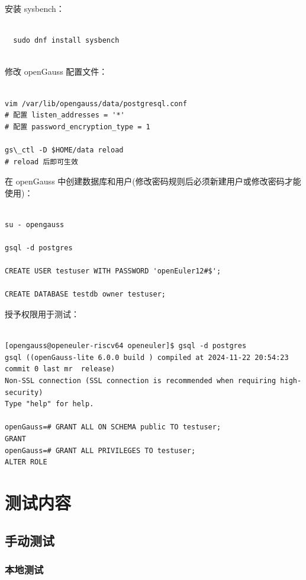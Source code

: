 \documentclass{article}
\begin{document}
安装 sysbench：

\begin{verbatim}
  
  sudo dnf install sysbench
  
\end{verbatim}

修改 openGauss 配置文件：

\begin{verbatim}
  
vim /var/lib/opengauss/data/postgresql.conf
# 配置 listen_addresses = '*'
# 配置 password_encryption_type = 1

gs\_ctl -D $HOME/data reload
# reload 后即可生效

\end{verbatim}

在 openGauss 中创建数据库和用户(修改密码规则后必须新建用户或修改密码才能使用)：

\begin{verbatim}
  
su - opengauss

gsql -d postgres

CREATE USER testuser WITH PASSWORD 'openEuler12#$';

CREATE DATABASE testdb owner testuser;

\end{verbatim}

授予权限用于测试：

\begin{verbatim}
  
[opengauss@openeuler-riscv64 openeuler]$ gsql -d postgres
gsql ((openGauss-lite 6.0.0 build ) compiled at 2024-11-22 20:54:23 commit 0 last mr  release)
Non-SSL connection (SSL connection is recommended when requiring high-security)
Type "help" for help.

openGauss=# GRANT ALL ON SCHEMA public TO testuser;
GRANT
openGauss=# GRANT ALL PRIVILEGES TO testuser; 
ALTER ROLE

\end{verbatim}


\section{测试内容}

\subsection{手动测试}

\subsubsection{本地测试}
\end{document}

